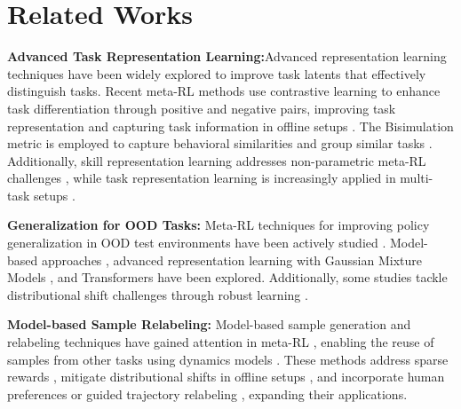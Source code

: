 \section{Related Works}
\label{sec:related_works}
\textbf{Advanced Task Representation Learning:}Advanced representation learning techniques have been widely explored to improve task latents that effectively distinguish tasks. Recent meta-RL methods use contrastive learning \cite{oord2018representation} to enhance task differentiation through positive and negative pairs, improving task representation \cite{laskin2020curl, fu2021towards, choshen2023contrabar} and capturing task information in offline setups \cite{li2020focal, gao2024context}. The Bisimulation metric \cite{ferns2011bisimulation} is employed to capture behavioral similarities \cite{zhanglearning, agarwal2021contrastive, liu2023robust} and group similar tasks \cite{hansen2022bisimulation, sodhani2022block}. Additionally, skill representation learning \cite{eysenbach2018diversity} addresses non-parametric meta-RL challenges \cite{frans2017meta, harrison2020continuous, nam2022skill, fu2022meta, he2024decoupling}, while task representation learning is increasingly applied in multi-task setups \cite{ishfaq2024offline, cheng2022provable, sodhani2021multi}.

\noindent \textbf{Generalization for OOD Tasks:} Meta-RL techniques for improving policy generalization in OOD test environments have been actively studied \cite{lan2019meta, fakoor2019meta, mu2022domino}. Model-based approaches \cite{lin2020model, lee2021improving}, advanced representation learning with Gaussian Mixture Models \cite{wang2023meta, lee2023parameterizing}, and Transformers \cite{vaswani2017attention, melo2022transformers, xumeta} have been explored. Additionally, some studies tackle distributional shift challenges through robust learning \cite{mendonca2020meta, mehta2020curriculum, ajay2022distributionally, pmlr-v162-chae22a, greenberg2024train}.


\noindent \textbf{Model-based Sample Relabeling:} Model-based sample generation and relabeling techniques have gained attention in meta-RL \cite{rimon2024mamba, 10565991}, enabling the reuse of samples from other tasks using dynamics models \cite{li2020multi, mendonca2020meta, wan2021hindsight, zou2024relabeling}. These methods address sparse rewards \cite{packer2021hindsight, jiang2024doubly}, mitigate distributional shifts in offline setups \cite{dorfman2021offline, yuan2022robust, zhou2024generalizable, guan2024cost}, and incorporate human preferences \cite{ren2022efficient, hejna2023few} or guided trajectory relabeling \cite{wang2023supervised}, expanding their applications.